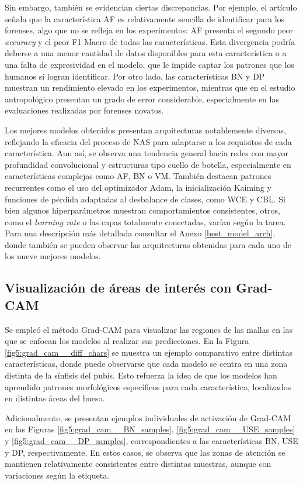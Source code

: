 Sin embargo, también se evidencian ciertas discrepancias. Por ejemplo, el artículo señala que la característica AF es relativamente sencilla de identificar para los forenses, algo que no se refleja en los experimentos: AF presenta el segundo peor \textit{accuracy} y el peor F1 Macro de todas las características. Esta divergencia podría deberse a una menor cantidad de datos disponibles para esta característica o a una falta de expresividad en el modelo, que le impide captar los patrones que los humanos sí logran identificar. Por otro lado, las características BN y DP muestran un rendimiento elevado en los experimentos, mientras que en el estudio antropológico presentan un grado de error considerable, especialmente en las evaluaciones realizadas por forenses novatos. 

Los mejores modelos obtenidos presentan arquitecturas notablemente diversas, reflejando la eficacia del proceso de NAS para adaptarse a los requisitos de cada característica. Aun así, se observa una tendencia general hacia redes con mayor profundidad convolucional y estructuras tipo cuello de botella, especialmente en características complejas como AF, BN o VM. También destacan patrones recurrentes como el uso del optimizador Adam, la inicialización Kaiming y funciones de pérdida adaptadas al desbalance de clases, como WCE y CBL. Si bien algunos hiperparámetros muestran comportamientos consistentes, otros, como el \textit{learning rate} o las capas totalmente conectadas, varían según la tarea. Para una descripción más detallada consultar el Anexo \ref{best_model_arch}, donde también se pueden observar las arquitecturas obtenidas para cada uno de los nueve mejores modelos.


\subsection{Visualización de áreas de interés con Grad-CAM}
\label{gradcam_analysis}

Se empleó el método Grad-CAM para visualizar las regiones de las mallas en las que se enfocan los modelos al realizar sus predicciones. En la Figura \ref{fig5:grad_cam__diff_chars} se muestra un ejemplo comparativo entre distintas características, donde puede observarse que cada modelo se centra en una zona distinta de la sínfisis del pubis. Esto refuerza la idea de que los modelos han aprendido patrones morfológicos específicos para cada característica, localizados en distintas áreas del hueso. 

Adicionalmente, se presentan ejemplos individuales de activación de Grad-CAM en las Figuras \ref{fig5:grad_cam__BN_samples}, \ref{fig5:grad_cam__USE_samples} y \ref{fig5:grad_cam__DP_samples}, correspondientes a las características BN, USE y DP, respectivamente. En estos casos, se observa que las zonas de atención se mantienen relativamente consistentes entre distintas muestras, aunque con variaciones según la etiqueta.

